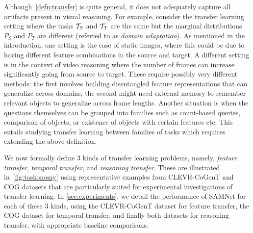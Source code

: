 Although~\cref{defn:transfer} is quite general, it does not adequately capture all artifacts present in visual reasoning.
For example, consider the transfer learning setting where the tasks $\mathcal{T}_S$ and $\mathcal{T}_T$ are the same
but the marginal distributions $P_S$ and $P_T$ are different (referred to as \emph{domain adaptation}).
As mentioned in the introduction, one setting is the case of static images,
where this could be due to having different feature combinations in the source and target.
A different setting is in the context of video reasoning where the number of frames can increase significantly going from source to target.
These require possibly very different methods: the first involves building disentangled feature representations that can generalize across
domains; the second might need external memory to remember relevant objects to generalize across frame lengths.
Another situation is when the questions themselves can be grouped into families such as count-based queries,
comparison of objects, or existence of objects with certain features etc.
This entails studying transfer learning between families of tasks which requires extending the above definition.

We now formally define 3 kinds of transfer learning problems, namely,
\emph{feature transfer}, \emph{temporal transfer},
and \emph{reasoning transfer}.
These are illustrated in~\cref{fig:taskonomy} using representative examples from CLEVR-CoGenT and COG datasets that are particularly suited for experimental
investigations of transfer learning.
In \cref{sec:experiments}, we detail the performance of
SAMNet for each of these 3 kinds, using the CLEVR-CoGenT dataset
for feature transfer, the COG dataset for temporal transfer, and finally
both datasets for reasoning transfer, with appropriate baseline comparisons.


